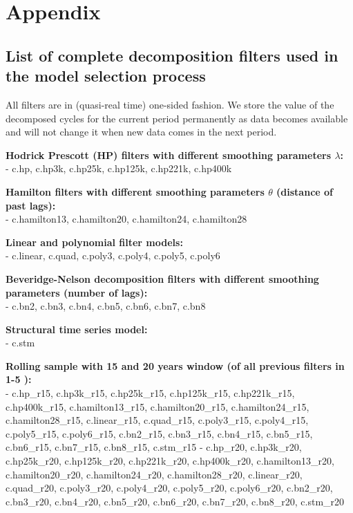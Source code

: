 \documentclass[
  12pt,
]{article}
\begin{document}
\hypertarget{appendix-appendix}{%
\appendix}


\hypertarget{appendix}{%
\section{Appendix}\label{appendix}}

\hypertarget{filterslist}{%
\subsection{List of complete decomposition filters used in the model selection process}\label{filterslist}}

All filters are in (quasi-real time) one-sided fashion. We store the value of the decomposed cycles for the current period permanently as data becomes available and will not change it when new data comes in the next period.

\textbf{Hodrick Prescott (HP) filters with different smoothing parameters \(\lambda\):\\
}- c.hp, c.hp3k, c.hp25k, c.hp125k, c.hp221k, c.hp400k

\textbf{Hamilton filters with different smoothing parameters \(\theta\) (distance of past lags):\\
}- c.hamilton13, c.hamilton20, c.hamilton24, c.hamilton28

\textbf{Linear and polynomial filter models:\\
}- c.linear, c.quad, c.poly3, c.poly4, c.poly5, c.poly6

\textbf{Beveridge-Nelson decomposition filters with different smoothing parameters (number of lags):\\
}- c.bn2, c.bn3, c.bn4, c.bn5, c.bn6, c.bn7, c.bn8

\textbf{Structural time series model:\\
}- c.stm

\textbf{Rolling sample with 15 and 20 years window (of all previous filters in 1-5 ):\\
}- c.hp\_r15, c.hp3k\_r15, c.hp25k\_r15, c.hp125k\_r15, c.hp221k\_r15, c.hp400k\_r15, c.hamilton13\_r15, c.hamilton20\_r15, c.hamilton24\_r15, c.hamilton28\_r15, c.linear\_r15, c.quad\_r15, c.poly3\_r15, c.poly4\_r15, c.poly5\_r15, c.poly6\_r15, c.bn2\_r15, c.bn3\_r15, c.bn4\_r15, c.bn5\_r15, c.bn6\_r15, c.bn7\_r15, c.bn8\_r15, c.stm\_r15
- c.hp\_r20, c.hp3k\_r20, c.hp25k\_r20, c.hp125k\_r20, c.hp221k\_r20, c.hp400k\_r20, c.hamilton13\_r20, c.hamilton20\_r20, c.hamilton24\_r20, c.hamilton28\_r20, c.linear\_r20, c.quad\_r20, c.poly3\_r20, c.poly4\_r20, c.poly5\_r20, c.poly6\_r20, c.bn2\_r20, c.bn3\_r20, c.bn4\_r20, c.bn5\_r20, c.bn6\_r20, c.bn7\_r20, c.bn8\_r20, c.stm\_r20
\end{document}
